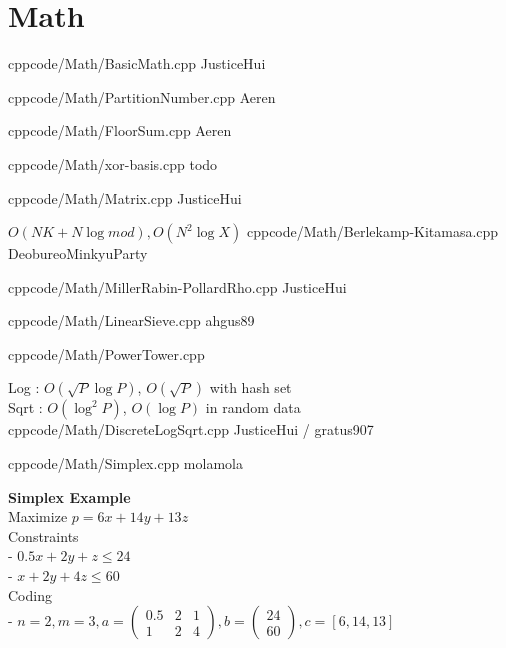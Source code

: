 \documentclass[landscape, 8pt, a4paper, oneside, twocolumn]{extarticle}
\begin{document}


\section{Math}

{}{}
{cpp}{code/Math/BasicMath.cpp}
{JusticeHui}

{}{}
{cpp}{code/Math/PartitionNumber.cpp}
{Aeren}

{}{}
{cpp}{code/Math/FloorSum.cpp}
{Aeren}

{}{}
{cpp}{code/Math/xor-basis.cpp}
{todo}

{}{}
{cpp}{code/Math/Matrix.cpp}
{JusticeHui}


{}{$O(NK + N \log mod), O(N^2 \log X)$}
{cpp}{code/Math/Berlekamp-Kitamasa.cpp}
{DeobureoMinkyuParty}

{}{}
{cpp}{code/Math/MillerRabin-PollardRho.cpp}
{JusticeHui}

{}{}
{cpp}{code/Math/LinearSieve.cpp}
{ahgus89}

{}{}
{cpp}{code/Math/PowerTower.cpp}
{}

{}{Log : $O(\sqrt P \log P)$, $O(\sqrt P)$ with hash set\\Sqrt : $O(\log^2 P)$, $O(\log P)$ in random data}
{cpp}{code/Math/DiscreteLogSqrt.cpp}
{JusticeHui / gratus907}

{}{}
{cpp}{code/Math/Simplex.cpp}
{molamola}

\noindent
\textbf{Simplex Example}\\
Maximize $p = 6x + 14y + 13z$\\
Constraints \\
- $0.5x + 2y + z \leq 24$\\
- $x + 2y + 4z \leq 60$\\
Coding\\
- $n = 2, m = 3, a = \begin{pmatrix} 0.5 & 2 & 1 \\ 1 & 2 & 4 \end{pmatrix}, b = \begin{pmatrix} 24 \\ 60 \end{pmatrix}, c = [6, 14, 13]$
\end{document}
